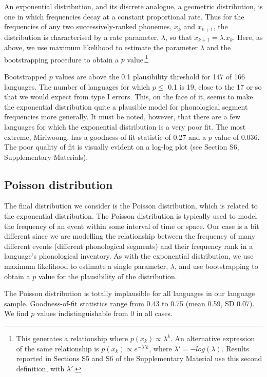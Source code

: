 An exponential distribution, and its discrete analogue, a geometric distribution, is one in which frequencies decay at a constant proportional rate. Thus for the frequencies of any two successively-ranked phonemes, \(x_k\) and \(x_{k+1}\), the distribution is characterised by a rate parameter, \(\lambda\), so that \(x_{k+1} = \lambda.x_k\). Here, as above, we use maximum likelihood to estimate the parameter \(\lambda\) and the bootstrapping procedure to obtain a \(p\) value.\footnote{This generates a relationship where \(p(x_k) \propto \lambda^k\). An alternative expression of the same relationship is \(p(x_k) \propto e^{-\lambda' k}\), where \(\lambda' = -log(\lambda)\). Results reported in Sections S5 and S6 of the Supplementary Material use this second definition, with \(\lambda'\).}

Bootstrapped \(p\) values are above the 0.1 plausibility threshold for 147 of 166 languages. The number of languages for which \(p \leq\) 0.1 is 19, close to the 17 or so that we would expect from type I errors. This, on the face of it, seems to make the exponential distribution quite a plausible model for phonological segment frequencies more generally. It must be noted, however, that there are a few languages for which the exponential distribution is a very poor fit. The most extreme, Miriwoong, has a goodness-of-fit statistic of 0.27 and a \(p\) value of 0.036. The poor quality of fit is visually evident on a log-log plot (see Section S6, Supplementary Materials).

\hypertarget{poisson-distribution}{%
\subsection{Poisson distribution}\label{poisson-distribution}}

The final distribution we consider is the Poisson distribution, which is related to the exponential distribution. The Poisson distribution is typically used to model the frequency of an event within some interval of time or space. Our case is a bit different since we are modelling the relationship between the frequency of many different events (different phonological segments) and their frequency rank in a language's phonological inventory. As with the exponential distribution, we use maximum likelihood to estimate a single parameter, \(\lambda\), and use bootstrapping to obtain a \(p\) value for the plausibility of the distribution.

The Poisson distribution is totally implausible for all languages in our language sample. Goodness-of-fit statistics range from 0.43 to 0.75 (mean 0.59, SD 0.07). We find \(p\) values indistinguishable from 0 in all cases.


